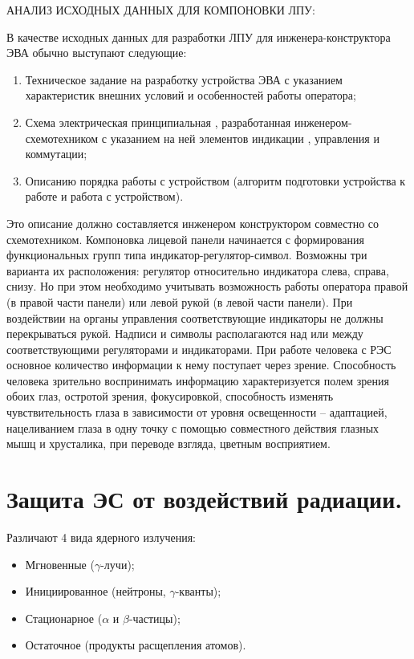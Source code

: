 \documentclass[unicode, 12pt, a4paper, oneside]{article}
\begin{document}
АНАЛИЗ ИСХОДНЫХ ДАННЫХ ДЛЯ КОМПОНОВКИ ЛПУ:

В качестве исходных данных для разработки ЛПУ для инженера-конструктора ЭВА обычно выступают следующие:
\begin{enumerate}
\item Техническое задание на разработку устройства ЭВА с указанием характеристик внешних условий и особенностей работы оператора;
\item Схема электрическая принципиальная , разработанная инженером-схемотехником с указанием на ней элементов индикации , управления и коммутации;
\item Описанию порядка работы с устройством (алгоритм подготовки устройства к работе и работа с устройством).
\end{enumerate}
Это описание должно составляется инженером конструктором совместно со схемотехником. Компоновка лицевой панели начинается с формирования функциональных групп типа индикатор-регулятор-символ. Возможны три варианта их расположения: регулятор относительно индикатора слева, справа, снизу. Но при этом необходимо учитывать возможность работы оператора правой (в правой части панели) или левой рукой (в левой части панели). При воздействии на органы управления соответствующие индикаторы не должны перекрываться рукой. Надписи и символы располагаются над или между соответствующими регуляторами и индикаторами. При работе человека с РЭС основное количество информации к нему поступает через зрение. Способность человека зрительно воспринимать информацию характеризуется полем зрения обоих глаз, остротой зрения, фокусировкой, способность изменять чувствительность глаза в зависимости от уровня освещенности – адаптацией, нацеливанием глаза в одну точку с помощью совместного действия глазных мышц и хрусталика, при переводе взгляда, цветным восприятием.

\section{Защита ЭС от воздействий радиации.}

Различают 4 вида ядерного излучения:

\begin{itemize}
\item Мгновенные ($\gamma$-лучи);
\item Инициированное (нейтроны, $\gamma$-кванты);
\item Стационарное ($\alpha$ и $\beta$-частицы);
\item Остаточное  (продукты расщепления атомов).
\end{itemize}
\end{document}
